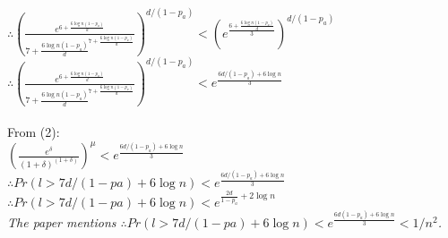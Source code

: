 \documentclass{article}
\begin{document}
$\therefore {(\frac{e^{6 + \frac{6\log n(1-p_a)}{d}}}{{7 + \frac{6\log n(1-p_a)}{d}}^{7 + \frac{6\log n(1-p_a)}{d}}})}^{d/(1-p_a)} <(e^\frac{{6 + \frac{6\log n(1-p_a)}{d}}}{3})^{d/(1-p_a)}$\\
$\therefore {(\frac{e^{6 + \frac{6\log n(1-p_a)}{d}}}{{7 + \frac{6\log n(1-p_a)}{d}}^{7 + \frac{6\log n(1-p_a)}{d}}})}^{d/(1-p_a)} <e^\frac{{6d/(1-p_a) + 6\log n}}{3}$\\
\\ 
From (2):\\
$(\frac{e^\delta}{(1+\delta)^(1+\delta)})^\mu < e^\frac{{6d/(1-p_a) + 6\log n}}{3}$\\
$\therefore Pr(l>7d/(1-pa)+6\log n) < e^\frac{{6d/(1-p_a) + 6\log n}}{3}$\\
$\therefore Pr(l>7d/(1-pa)+6\log n) < e^{\frac{2d}{1-p_a} + 2\log n}$\\

\textit{The paper mentions $\therefore Pr(l>7d/(1-pa)+6\log n) < e^\frac{6d(1-p_a) + 6\log n}{3} < 1/n^2$.}
\end{document}
